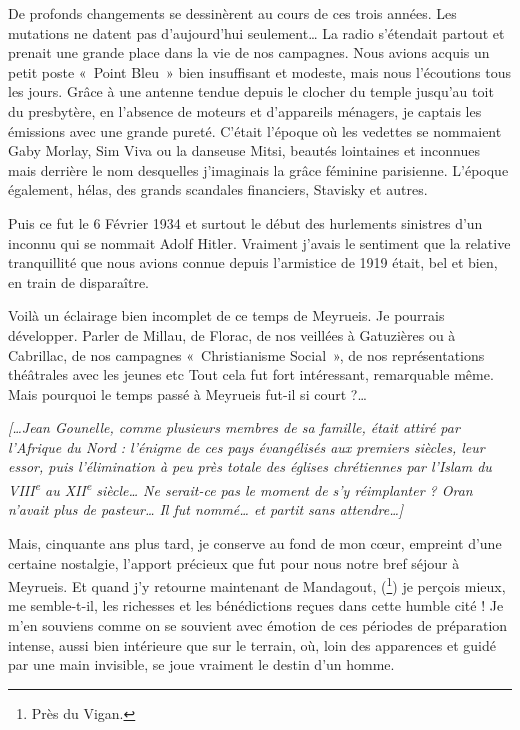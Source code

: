 De profonds changements se dessinèrent au cours de ces trois années. Les mutations
ne datent pas d’aujourd’hui seulement… La radio s’étendait partout et prenait une
grande place dans la vie de nos campagnes. Nous avions acquis un petit poste «~Point
Bleu~» bien insuffisant et modeste, mais nous l’écoutions tous les jours. Grâce à une
antenne tendue depuis le clocher du temple jusqu’au toit du presbytère, en l’absence
de moteurs et d’appareils ménagers, je captais les émissions avec une grande pureté.
C’était l’époque où les vedettes se nommaient Gaby Morlay, Sim Viva ou la
danseuse Mitsi, beautés lointaines et inconnues mais derrière le nom desquelles
j’imaginais la grâce féminine parisienne. L’époque également, hélas, des grands
scandales financiers, Stavisky et autres.

Puis ce fut le 6 Février 1934 et surtout le début des hurlements sinistres d’un inconnu
qui se nommait Adolf Hitler. Vraiment j’avais le sentiment que la relative tranquillité
que nous avions connue depuis l’armistice de 1919 était, bel et bien, en train de
disparaître.

Voilà un éclairage bien incomplet de ce temps de Meyrueis. Je pourrais développer.
Parler de Millau, de Florac, de nos veillées à Gatuzières ou à Cabrillac, de nos
campagnes «~Christianisme Social~», de nos représentations théâtrales avec les jeunes
etc Tout cela fut fort intéressant, remarquable même. Mais pourquoi le temps passé à
Meyrueis fut-il si court ?…

\emph{[…Jean Gounelle, comme plusieurs membres de sa famille, était attiré par l’Afrique du Nord :
l’énigme de ces pays évangélisés aux premiers siècles, leur essor, puis l’élimination à peu près totale
des églises chrétiennes par l’Islam du VIII\textsuperscript{e} au XII\textsuperscript{e} siècle… Ne serait-ce pas le moment de s’y réimplanter ? Oran n’avait plus de pasteur… Il fut nommé… et partit sans attendre…]}

Mais, cinquante ans plus tard, je conserve au fond de mon cœur, empreint d’une
certaine nostalgie, l’apport précieux que fut pour nous notre bref séjour à Meyrueis.
Et quand j’y retourne maintenant de Mandagout, (\footnote{Près du Vigan.}) je perçois mieux, me
semble-t-il, les richesses et les bénédictions reçues dans cette humble cité ! Je m’en
souviens comme on se souvient avec émotion de ces périodes de préparation intense,
aussi bien intérieure que sur le terrain, où, loin des apparences et guidé par une main
invisible, se joue vraiment le destin d’un homme.

